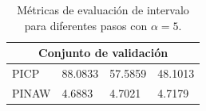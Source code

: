 \documentclass[12pt]{article}
\begin{document}
\begin{table}[h!]
	\centering
	\caption{Métricas de evaluación de intervalo para diferentes pasos con $\alpha = 5$.}
	\begin{tabular}{|l|l|l|l|}
		\hline
		\multicolumn{4}{|c|}{Conjunto de validación} \\ \hline
		PICP     & 88.0833   & 57.5859   & 48.1013   \\ \hline
		PINAW    & 4.6883    & 4.7021    & 4.7179    \\ \hline
	\end{tabular}
\label{pinc_red}
\end{table}

\clearpage
\newpage



%
%
%
%
%
\end{document}
